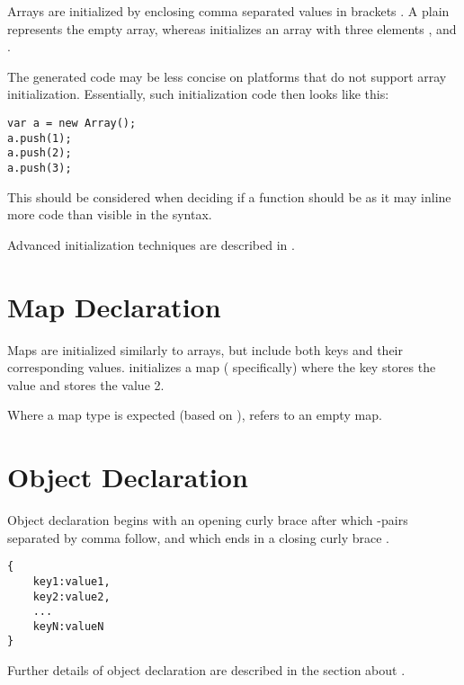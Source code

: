 Arrays are initialized by enclosing comma \expr{,} separated values in brackets \expr{[]}. A plain \expr{[]} represents the empty array, whereas \expr{[1, 2, 3]} initializes an array with three elements ,  and .

The generated code may be less concise on platforms that do not support array initialization. Essentially, such initialization code then looks like this:

\begin{lstlisting}
var a = new Array();
a.push(1);
a.push(2);
a.push(3);
\end{lstlisting}
This should be considered when deciding if a function should be  as it may inline more code than visible in the syntax.

Advanced initialization techniques are described in .

\section{Map Declaration}
\label{expression-map-declaration}

Maps are initialized similarly to arrays, but include both keys and their corresponding values. \expr{["example" => 1, "data" => 2]} initializes a map ( specifically) where the key  stores the value  and  stores the value 2.


Where a map type is expected (based on ), \expr{[]} refers to an empty map.


\section{Object Declaration}
\label{expression-object-declaration}

Object declaration begins with an opening curly brace \expr{\{} after which -pairs separated by comma \expr{,} follow, and which ends in a closing curly brace \expr{\}}.

\begin{lstlisting}
{
	key1:value1,
	key2:value2,
	...
	keyN:valueN
}
\end{lstlisting}
Further details of object declaration are described in the section about .


